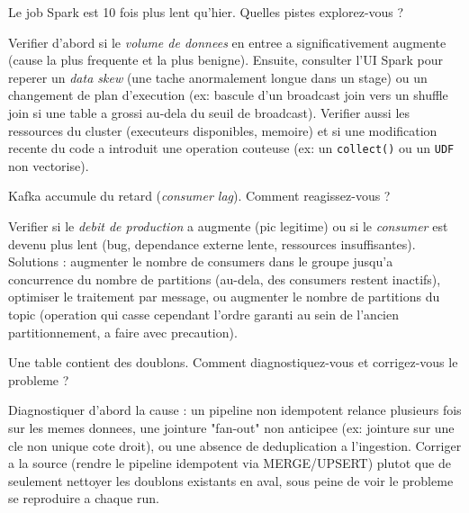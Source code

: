 \documentclass[11pt,a4paper]{article}
\begin{document}
\begin{question} Le job Spark est 10 fois plus lent qu'hier. Quelles pistes explorez-vous ?
\end{question}
\begin{reponse}
Verifier d'abord si le \emph{volume de donnees} en entree a significativement augmente (cause la plus frequente et la plus benigne). Ensuite, consulter l'UI Spark pour reperer un \emph{data skew} (une tache anormalement longue dans un stage) ou un changement de plan d'execution (ex: bascule d'un broadcast join vers un shuffle join si une table a grossi au-dela du seuil de broadcast). Verifier aussi les ressources du cluster (executeurs disponibles, memoire) et si une modification recente du code a introduit une operation couteuse (ex: un \texttt{collect()} ou un \texttt{UDF} non vectorise).
\end{reponse}

\begin{question} Kafka accumule du retard (\emph{consumer lag}). Comment reagissez-vous ?
\end{question}
\begin{reponse}
Verifier si le \emph{debit de production} a augmente (pic legitime) ou si le \emph{consumer} est devenu plus lent (bug, dependance externe lente, ressources insuffisantes). Solutions : augmenter le nombre de consumers dans le groupe jusqu'a concurrence du nombre de partitions (au-dela, des consumers restent inactifs), optimiser le traitement par message, ou augmenter le nombre de partitions du topic (operation qui casse cependant l'ordre garanti au sein de l'ancien partitionnement, a faire avec precaution).
\end{reponse}

\begin{question} Une table contient des doublons. Comment diagnostiquez-vous et corrigez-vous le probleme ?
\end{question}
\begin{reponse}
Diagnostiquer d'abord la cause : un pipeline non idempotent relance plusieurs fois sur les memes donnees, une jointure "fan-out" non anticipee (ex: jointure sur une cle non unique cote droit), ou une absence de deduplication a l'ingestion. Corriger a la source (rendre le pipeline idempotent via MERGE/UPSERT) plutot que de seulement nettoyer les doublons existants en aval, sous peine de voir le probleme se reproduire a chaque run.
\end{reponse}
\end{document}
